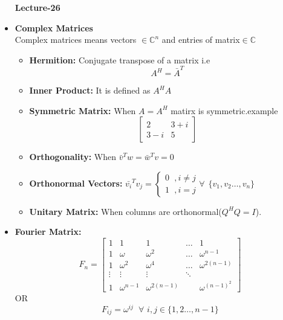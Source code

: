 \documentclass[a4paper,11pt]{article}
\numberwithin{equation}{section}
\begin{document}
\begin{itemize}
\begin{center}
    \Huge{\textbf{Lecture-26}}
\end{center}
\vspace{5pt}

\item \textbf{Complex Matrices}\\

Complex matrices means vectors $\in \mathbb{C}^n$ and entries of matrix$\in \mathbb{C}$

\begin{itemize}
    \item \textbf{Hermition: }Conjugate transpose of a matrix i.e
    \[A^H=\bar{A}^T\]
    \item \textbf{Inner Product: }It is defined as $A^HA$
    \item \textbf{Symmetric Matrix: }When $A=A^H$ matirx is symmetric.example\[\begin{bmatrix}
        2&3+i\\3-i&5
    \end{bmatrix}\]
    \item \textbf{Orthogonality: }When $\bar{v}^Tw=\bar{w}^Tv=0$
    \item \textbf{Orthonormal Vectors: }$\bar{v_i}^Tv_j=\begin{cases}
        0 \hspace{7pt} ,i\neq j\\
        1 \hspace{7pt} ,i=j
    \end{cases} \forall \hspace{5pt}\{v_1,v_2\dots,v_n\}$ 
    \item \textbf{Unitary Matrix: }When columns are orthonormal($Q^HQ=I$).
    
\end{itemize}

\item \textbf{Fourier Matrix: }
\[F_n=\begin{bmatrix}
    1&1&1&\dots&1\\
    1&\omega&\omega^2&\dots&\omega^{n-1}\\
    1&\omega^2&\omega^4&\dots&\omega^{2(n-1)}\\
    \vdots&\vdots&\vdots&\ddots&\\
    1&\omega^{n-1}&\omega^{2(n-1)}&&\omega^{(n-1)^2}
\end{bmatrix}
\]
OR\[
    F_{ij}=\omega^{ij} \hspace{7pt} \forall \hspace{4pt} i,j\in \{1,2\dots,n-1\}
\]


\end{itemize}
\end{document}
